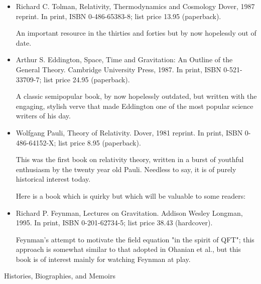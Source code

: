 \documentclass[10pt,a4paper]{book}
\theoremstyle{definition}
\begin{document}
\begin{itemize}
\item Richard C. Tolman,
Relativity, Thermodynamics and Cosmology
Dover, 1987 reprint.
In print, ISBN 0-486-65383-8; list price 13.95 (paperback).

An important resource in the thirties and forties but by now hopelessly out of date.

\item Arthur S. Eddington,
Space, Time and Gravitation: An Outline of the General Theory.
Cambridge University Press, 1987.
In print, ISBN 0-521-33709-7; list price 24.95 (paperback).

A classic semipopular book, by now hopelessly outdated, but written with the engaging, stylish verve that made Eddington one of the most popular science writers of his day.

\item Wolfgang Pauli,
Theory of Relativity.
Dover, 1981 reprint.
In print, ISBN 0-486-64152-X; list price 8.95 (paperback).

This was the first book on relativity theory, written in a burst of youthful enthusiasm by the twenty year old Pauli.  Needless to say, it is of purely historical interest today.

Here is a book which is quirky but which will be valuable to some readers:

\item Richard P. Feynman,
Lectures on Gravitation.
Addison Wesley Longman, 1995.
In print, ISBN 0-201-62734-5; list price 38.43 (hardcover).

Feynman's attempt to motivate the field equation "in the spirit of QFT"; this approach is somewhat similar to that adopted in Ohanian et al., but this book is of interest mainly for watching Feynman at play.
\end{itemize}


Histories, Biographies, and Memoirs
\end{document}
